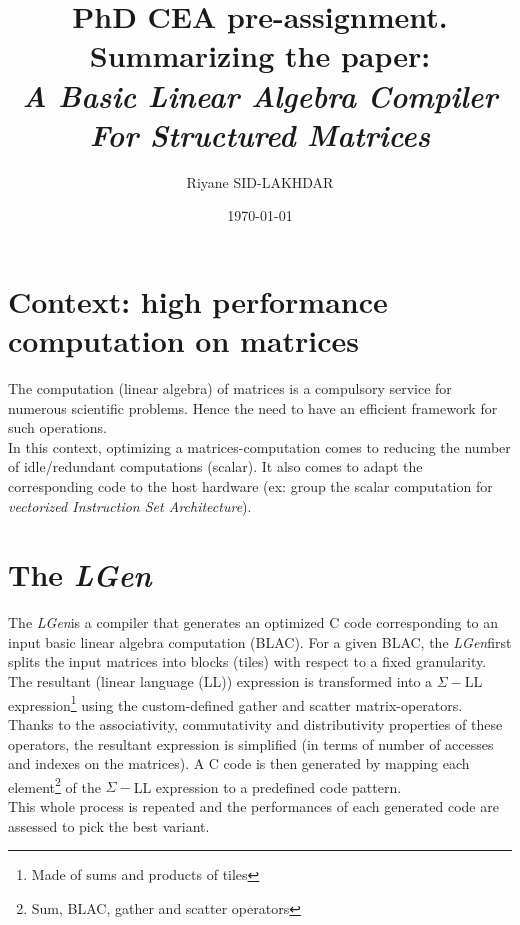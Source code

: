 \documentclass[11pt]{article}											%
\title
{
	PhD CEA pre-assignment.   Summarizing the paper: \\
	\emph{A Basic Linear Algebra Compiler For Structured Matrices\cite{mainPaper}}
}
\author{Riyane SID-LAKHDAR}
\date{\today}
\newcommand{\targetname}			{\emph{LGen}}
\begin{document}
\maketitle


\tableofcontents
\newpage



\section{Context: high performance computation on matrices}
	The computation (linear algebra) of matrices is a compulsory service for numerous scientific problems.   Hence the need to have an efficient framework for such operations.\\
	In this context, optimizing a matrices-computation comes to reducing the number of idle/redundant computations (scalar).   It also comes to adapt the corresponding code to the host hardware (ex: group the scalar computation for \emph{vectorized Instruction Set Architecture}).


\section{The \targetname}\label{section:background}
	The \targetname\space is a compiler that generates an optimized C code corresponding to an input basic linear algebra computation (BLAC).
	For a given BLAC, the \targetname\space first splits the input matrices into blocks (tiles) with respect to a fixed granularity.   The resultant (linear language (LL)) expression is transformed into a $\Sigma-$LL expression\footnote{Made of sums and products of tiles} using the custom-defined gather and scatter matrix-operators.   Thanks to the associativity, commutativity and distributivity properties of these operators, the resultant expression is simplified (in terms of number of accesses and indexes on the matrices).   A C code is then generated by mapping each element\footnote{Sum, BLAC, gather and scatter operators} of the $\Sigma-$LL expression to a predefined code pattern.\\
	This whole process is repeated and the performances of each generated code are assessed to pick the best variant.\\
\end{document}
